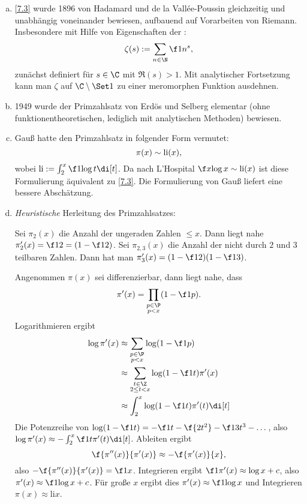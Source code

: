 \begin{nt} \label{7.4}
	\begin{enumerate}[a)]
		\item
			\ref{7.3} wurde 1896 von Hadamard und de la Vallée-Poussin gleichzeitig und unabhängig voneinander bewiesen, aufbauend auf Vorarbeiten von Riemann.
			Insbesondere mit Hilfe von Eigenschaften der :
			\[
				\zeta(s) := \sum_{n\in \N} \f 1{n^s},
			\]
			zunächst definiert für $s \in \C$ mit $\Re(s) > 1$.
			Mit analytischer Fortsetzung kann man $\zeta$ auf $\C \setminus \Set 1$ zu einer meromorphen Funktion ausdehnen.
		\item
			1949 wurde der Primzahlsatz von Erdös und Selberg elementar (ohne funktionentheoretischen, lediglich mit analytischen Methoden) bewiesen.
		\item
			Gauß hatte den Primzahlsatz in folgender Form vermutet:
			\[
				\pi(x) \sim \operatorname{li}(x),
			\]
			wobei $\li := \int_{2}^x \f 1{\log t} \di[t]$.
			Da nach L'Hospital $\f x{\log x} \sim \li(x)$ ist diese Formulierung äquivalent zu \ref{7.3}.
			Die Formulierung von Gauß liefert eine bessere Abschätzung.
		\item
			\emph{Heuristische} Herleitung des Primzahlsatzes:

			Sei $\pi_2(x)$ die Anzahl der ungeraden Zahlen $\le x$.
			Dann liegt nahe $\pi_2'(x) = \f 12 = (1 - \f 12)$.
			Sei $\pi_{2,3}(x)$ die Anzahl der nicht durch $2$ und $3$ teilbaren Zahlen.
			Dann hat man $\pi_3'(x) = (1 - \f 12)(1 - \f 13)$.

			Angenommen $\pi(x)$ sei differenzierbar, dann liegt nahe, dass
			\[
				\pi'(x) = \prod_{\substack{p\in \P \\ p < x}} (1 - \f 1p).
			\]
			Logarithmieren ergibt
			\begin{align*}
				\log \pi'(x) &\approx \sum_{\substack{p \in \P \\ p < x}} \log(1 - \f 1p) \\
				&\approx \sum_{\substack{t \in \Z \\ 2 \le t < x}} \log(1 - \f 1t) \pi'(x) \\
				&\approx \int_2^x \log(1 - \f 1t) \pi'(t) \di[t] 
			\end{align*}
			Die Potenzreihe von $\log(1 - \f 1t) = - \f 1t - \f {2t^2} - \f 1{3t^3} - \dotsc$, also $\log \pi'(x) \approx -\int_2^x \f 1t \pi'(t) \di[t]$.
			Ableiten ergibt
			\[
				\f{\pi''(x)}{\pi'(x)} \approx - \f{\pi'(x)}{x},
			\]
			also $- \f{\pi''(x)}{\pi'(x)} = \f 1{x}$.
			Integrieren ergibt $\f 1{\pi'(x)} \approx \log x + c$, also $\pi'(x) \approx \f 1{\log x + c}$.
			Für große $x$ ergibt dies $\pi'(x) \approx \f 1{\log x}$ und Integrieren $\pi(x) \approx \mathrm{li} x$.
	\end{enumerate}
\end{nt}

